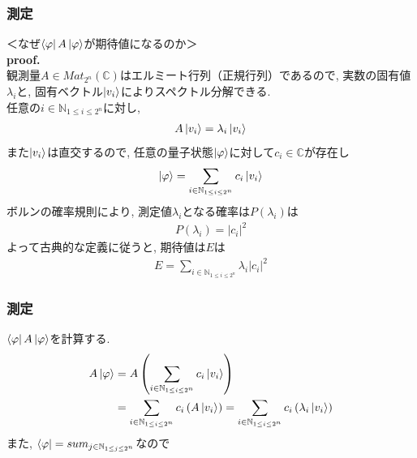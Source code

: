 \documentclass[9pt]{beamer}
\begin{document}
\begin{frame}
  \frametitle{測定}
  ＜なぜ$\bra{\varphi}A\ket{\varphi}$が期待値になるのか＞\\
  \textbf{proof.} \\
  観測量$A \in Mat_{2^n}(\mathbb{C})$はエルミート行列（正規行列）であるので, 実数の固有値$\lambda_i$と, 固有ベクトル$\ket{v_i}$によりスペクトル分解できる. \\
  任意の$i \in \mathbb{N}_{1\le i \le 2^n}$に対し,
  \begin{align}
    A\ket{v_i} = \lambda_i \ket{v_i}
  \end{align}
  また$\ket{v_i}$は直交するので, 任意の量子状態$\ket{\varphi}$に対して$c_i \in \mathbb{C}$が存在し
  \begin{align}
    \ket{\varphi} = \sum_{i \in \mathbb{N}_{1 \le i \le 2^n}} c_i \ket{v_i}
  \end{align}
  ボルンの確率規則により, 測定値$\lambda_i$となる確率は$P\left(\lambda_i\right)$は
  \begin{align}
    P\left( \lambda_i \right) = |c_i|^2
  \end{align}
  よって古典的な定義に従うと, 期待値は$E$は
  \begin{align}
    E = \sum_{i \in \mathbb{N}_{1 \le i \le 2^n}} \lambda_i |c_i|^2
  \end{align}
\end{frame}

\begin{frame}
\frametitle{測定}
$\bra{\varphi}A\ket{\varphi}$を計算する.
\begin{align}
  A\ket{\varphi} &= A \left( \sum_{i \in \mathbb{N}_{1 \le i \le 2^n}} c_i \ket{v_i} \right)\\
  &= \sum_{i \in \mathbb{N}_{1 \le i \le 2^n}} c_i \left( A \ket{v_i} \right) = \sum_{i \in \mathbb{N}_{1 \le i \le 2^n}} c_i \left( \lambda_i \ket{v_i} \right)
\end{align}
また, $\bra{\varphi} = sum_{j \in \mathbb{N}_{1 \le j \le 2^n}}$なので

\end{frame}
\end{document}
